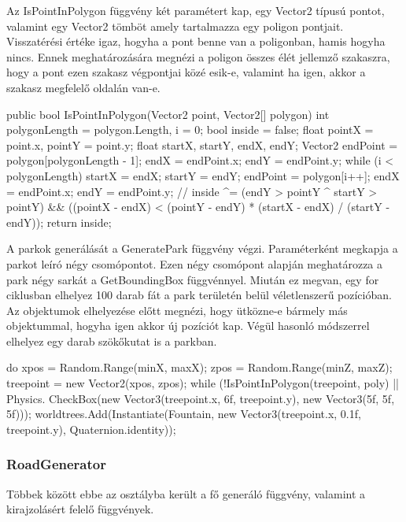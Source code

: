 Az IsPointInPolygon függvény két paramétert kap, egy Vector2 típusú pontot, valamint egy Vector2 tömböt amely tartalmazza egy poligon pontjait. Visszatérési értéke igaz, hogyha a pont benne van a poligonban, hamis hogyha nincs. Ennek meghatározására megnézi a poligon összes élét jellemző szakaszra, hogy a pont ezen szakasz végpontjai közé esik-e, valamint ha igen, akkor a szakasz megfelelő oldalán van-e.
\begin{cpp}
public bool IsPointInPolygon(Vector2 point, Vector2[] polygon)
    {
        int polygonLength = polygon.Length, i = 0;
        bool inside = false;
        float pointX = point.x, pointY = point.y;
        float startX, startY, endX, endY;
        Vector2 endPoint = polygon[polygonLength - 1];
        endX = endPoint.x;
        endY = endPoint.y;
        while (i < polygonLength)
        {
            startX = endX; startY = endY;
            endPoint = polygon[i++];
            endX = endPoint.x; endY = endPoint.y;
            //
            inside ^= (endY > pointY ^ startY > pointY)
                      && ((pointX - endX) < (pointY - endY) * 
                      (startX - endX) / (startY - endY));
        }
        return inside;
    }
\end{cpp}

A parkok generálását a GeneratePark függvény végzi. Paraméterként megkapja a parkot leíró négy csomópontot. Ezen négy csomópont alapján meghatározza a park négy sarkát a GetBoundingBox függvénnyel. Miután ez megvan, egy for ciklusban elhelyez 100 darab fát a park területén belül véletlenszerű pozícióban. Az objektumok elhelyezése előtt megnézi, hogy ütközne-e bármely más objektummal, hogyha igen akkor új pozíciót kap. Végül hasonló módszerrel elhelyez egy darab szökőkutat is a parkban.
\begin{cpp}
do
        {
            xpos = Random.Range(minX, maxX);
            zpos = Random.Range(minZ, maxZ);
            treepoint = new Vector2(xpos, zpos);
        } while (!IsPointInPolygon(treepoint, poly) || Physics.
        CheckBox(new Vector3(treepoint.x, 6f, treepoint.y), 
        new Vector3(5f, 5f, 5f)));
        worldtrees.Add(Instantiate(Fountain, new Vector3(treepoint.x, 
        0.1f, treepoint.y), Quaternion.identity));
\end{cpp}
\subsubsection{RoadGenerator}
Többek között ebbe az osztályba került a fő generáló függvény, valamint a kirajzolásért felelő függvények.

